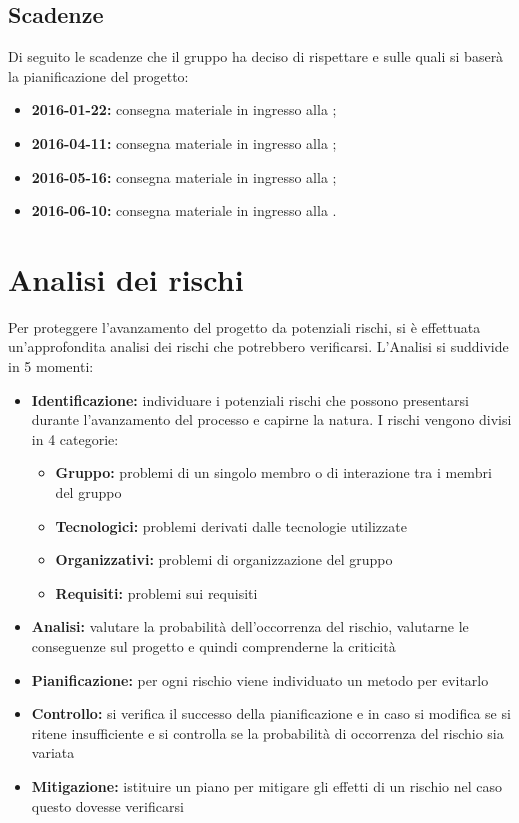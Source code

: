 \documentclass[12pt,a4paper]{article}
\begin{document}
\subsection{Scadenze}
Di seguito le scadenze che il gruppo \nomeGruppo{} ha deciso di rispettare e sulle quali si baserà la pianificazione del progetto:
\begin{itemize}
	\item \textbf{2016-01-22:} consegna materiale in ingresso alla \RR;
	\item \textbf{2016-04-11:} consegna materiale in ingresso alla \RP;
	\item \textbf{2016-05-16:} consegna materiale in ingresso alla \RQ;
	\item \textbf{2016-06-10:} consegna materiale in ingresso alla \RA.
\end{itemize}

\newpage

\section{Analisi dei rischi}

Per proteggere l’avanzamento del progetto da potenziali rischi, si è effettuata un’approfondita analisi dei rischi che potrebbero verificarsi. L’Analisi si suddivide in 5 momenti:
\begin{itemize}
	\item \textbf{Identificazione:} individuare i potenziali rischi che possono presentarsi durante l’avanzamento del processo e capirne la natura. I rischi vengono divisi in 4 categorie:
	\begin{itemize}
		\item \textbf{Gruppo:} problemi di un singolo membro o di interazione tra i membri del gruppo
		\item \textbf{Tecnologici:} problemi derivati dalle tecnologie utilizzate
		\item \textbf{Organizzativi:} problemi di organizzazione del gruppo
		\item \textbf{Requisiti:} problemi sui requisiti
	\end{itemize}
	\item \textbf{Analisi:} valutare la probabilità dell’occorrenza del rischio, valutarne le conseguenze sul progetto e quindi comprenderne la criticità
	\item \textbf{Pianificazione:} per ogni rischio viene individuato un metodo per evitarlo
	\item \textbf{Controllo:} si verifica il successo della pianificazione e in caso si modifica se si ritene insufficiente e si controlla se la probabilità di occorrenza del rischio sia variata
	\item \textbf{Mitigazione:} istituire un piano per mitigare gli effetti di un rischio nel caso questo dovesse verificarsi
\end{itemize}
\end{document}

